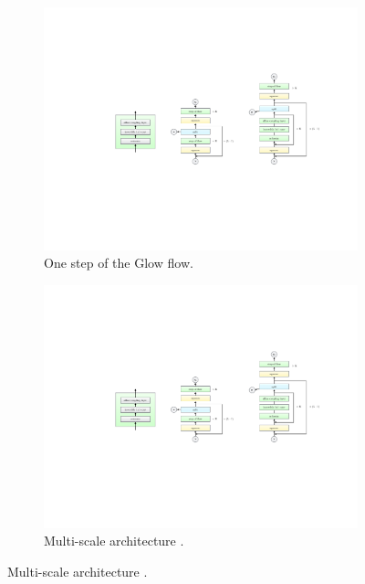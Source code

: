 \documentclass[fleqn,usenatbib]{mnras}
\begin{document}
\begin{figure}
    \centering
    \begin{subfigure}[b]{0.35\columnwidth}
        \centering
        \includegraphics[width=\linewidth]{fig-Glow-1.pdf}
        \caption{One step of the Glow flow.}
    \end{subfigure}%
    \quad
    \begin{subfigure}[b]{0.5\columnwidth}
        \centering
        \includegraphics[width=\linewidth]{fig-Glow-2.pdf}
        \caption{Multi-scale architecture \citep{DinhSB17}.}
    \end{subfigure}

\end{figure}
\end{document}
